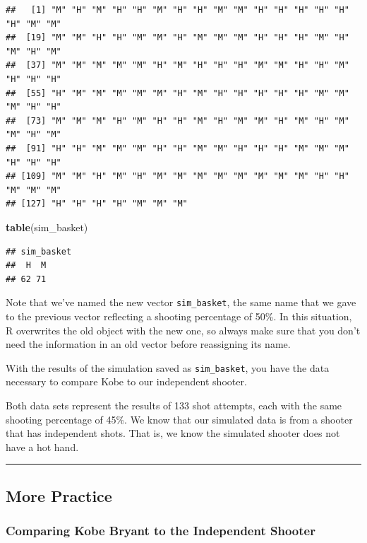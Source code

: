 \documentclass[
]{article}
\newenvironment{Shaded}{\begin{snugshade}}{\end{snugshade}}
\newcommand{\FunctionTok}[1]{\textcolor[rgb]{0.13,0.29,0.53}{\textbf{#1}}}
\newcommand{\NormalTok}[1]{#1}
\begin{document}
\begin{verbatim}
##   [1] "M" "H" "M" "H" "H" "M" "H" "H" "M" "M" "H" "H" "H" "H" "H" "H" "M" "M"
##  [19] "M" "M" "H" "H" "M" "M" "H" "M" "M" "M" "H" "H" "H" "M" "H" "M" "H" "M"
##  [37] "M" "M" "M" "M" "M" "H" "M" "H" "H" "H" "M" "M" "H" "H" "M" "H" "H" "H"
##  [55] "H" "M" "M" "M" "M" "M" "H" "M" "H" "H" "H" "H" "H" "M" "M" "M" "H" "H"
##  [73] "M" "M" "M" "H" "M" "H" "H" "M" "H" "M" "M" "H" "M" "H" "M" "M" "H" "M"
##  [91] "H" "H" "M" "M" "M" "H" "H" "M" "M" "H" "H" "H" "M" "M" "M" "H" "H" "H"
## [109] "M" "M" "H" "M" "H" "M" "M" "M" "M" "M" "M" "M" "M" "H" "H" "M" "M" "M"
## [127] "H" "H" "H" "H" "M" "M" "M"
\end{verbatim}

\begin{Shaded}
\begin{Highlighting}[]
\FunctionTok{table}\NormalTok{(sim\_basket)}
\end{Highlighting}
\end{Shaded}

\begin{verbatim}
## sim_basket
##  H  M 
## 62 71
\end{verbatim}

Note that we've named the new vector \texttt{sim\_basket}, the same name
that we gave to the previous vector reflecting a shooting percentage of
50\%. In this situation, R overwrites the old object with the new one,
so always make sure that you don't need the information in an old vector
before reassigning its name.

With the results of the simulation saved as \texttt{sim\_basket}, you
have the data necessary to compare Kobe to our independent shooter.

Both data sets represent the results of 133 shot attempts, each with the
same shooting percentage of 45\%. We know that our simulated data is
from a shooter that has independent shots. That is, we know the
simulated shooter does not have a hot hand.

\begin{center}\rule{0.5\linewidth}{0.5pt}\end{center}

\subsection{More Practice}\label{more-practice}

\subsubsection{Comparing Kobe Bryant to the Independent
Shooter}\label{comparing-kobe-bryant-to-the-independent-shooter}
\end{document}
